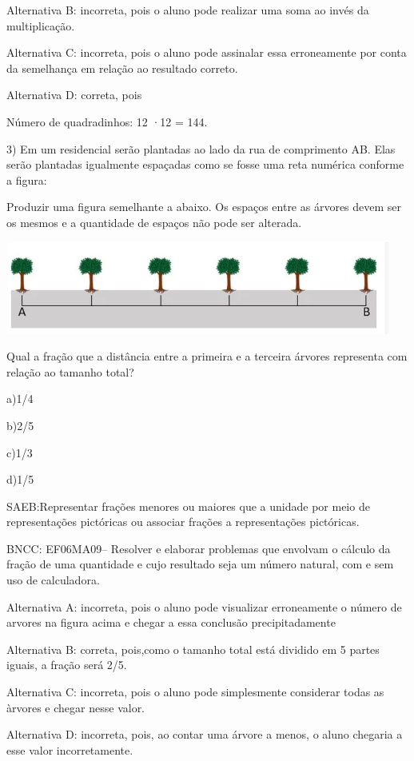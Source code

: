 Alternativa B: incorreta, pois o aluno pode realizar uma soma ao invés
da multiplicação.

Alternativa C: incorreta, pois o aluno pode assinalar essa erroneamente
por conta da semelhança em relação ao resultado correto.

Alternativa D: correta, pois

Número de quadradinhos: 12 ·12 = 144.

3) Em um residencial serão plantadas ao lado da rua de comprimento AB.
Elas serão plantadas igualmente espaçadas como se fosse uma reta
numérica conforme a figura:

Produzir uma figura semelhante a abaixo. Os espaços entre as árvores
devem ser os mesmos e a quantidade de espaços não pode ser alterada.

\includegraphics[width=5in,height=1.19792in]{./imgSAEB_6_MAT/media/image109.png}

Qual a fração que a distância entre a primeira e a terceira árvores
representa com relação ao tamanho total?

a)1/4

b)2/5

c)1/3

d)1/5

SAEB:Representar frações menores ou maiores que a unidade por meio de
representações pictóricas ou associar frações a representações
pictóricas.

BNCC: EF06MA09-- Resolver e elaborar problemas que envolvam o cálculo da
fração de uma quantidade e cujo resultado seja um número natural, com e
sem uso de calculadora.

Alternativa A: incorreta, pois o aluno pode visualizar erroneamente o
número de arvores na figura acima e chegar a essa conclusão
precipitadamente

Alternativa B: correta, pois,como o tamanho total está dividido em 5
partes iguais, a fração será 2/5.

Alternativa C: incorreta, pois o aluno pode simplesmente considerar
todas as àrvores e chegar nesse valor.

Alternativa D: incorreta, pois, ao contar uma árvore a menos, o aluno
chegaria a esse valor incorretamente.

